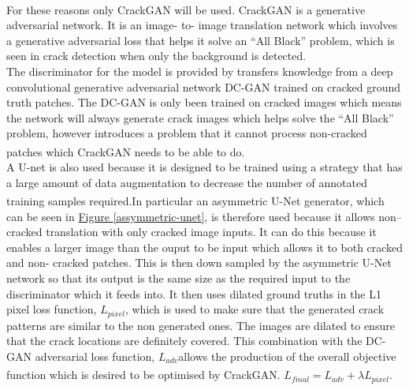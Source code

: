 \documentclass[11pt]{article}		%
\newcommand{\supercite}[1]{\textsuperscript{\cite{#1}}}		%
\newcommand{\figref}[1]{\hyperref[#1]{Figure \ref*{#1}}}    %
\begin{document}
            \begin{floatingfigure}[r]{0pt} \end{floatingfigure}
            
             For these reasons only CrackGAN will be used. \supercite{CrackGAN1} 
CrackGAN is a generative adversarial network. It is an image- to- image translation network which involves a generative adversarial loss that helps it solve an “All Black” problem, which is seen in crack detection when only the background is detected. \\
The discriminator for the model is provided by transfers knowledge from a deep convolutional generative adversarial network DC-GAN trained on cracked ground truth patches. The DC-GAN is only been trained on cracked images which means the network will always generate crack images which helps solve the “All Black” problem, however introduces a problem that it cannot process non-cracked patches which CrackGAN needs to be able to do. \supercite{CrackGAN1} 
\\ \hspace*{3ex}
A U-net is also used because it is designed to be trained using a strategy that has a large amount of data augmentation to decrease the number of annotated training samples required.\supercite{U-Net}In particular an asymmetric U-Net generator, which can be seen in \figref{assymmetric-unet},  is therefore used because it allows non--cracked translation with only cracked image inputs. It can do this because it enables a larger image than the ouput to be input which allows it to both cracked and non- cracked patches. This is then down sampled by the asymmetric U-Net network so that its output is the same size as the required input to the discriminator which it feeds into. It then uses dilated ground truths in the L1 pixel loss function, $L_{pixel}$, which is used to make sure that the generated crack patterns are similar to the non generated ones. The images are dilated to ensure that the crack locations are definitely covered. This combination with the DC-GAN adversarial loss function, $L_{adv}$allows the production of the overall objective function which is desired to be optimised by CrackGAN. $L_{final}=L_{adv}+\lambda L_{pixel}$.\supercite{CrackGAN1} 
			
			
\end{document}

